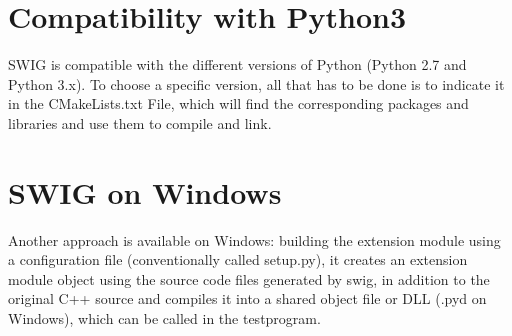 \section{Compatibility with Python3}
SWIG is compatible with the different versions of Python (Python 2.7 and Python 3.x). To choose a specific version, all that has to be done is to indicate it in the CMakeLists.txt File, which will find the corresponding packages and libraries and use them to compile and link.

\section{SWIG on Windows}
Another approach is available on Windows: building the extension module using a configuration file (conventionally called setup.py), it creates an extension module object using the source code files generated by swig, in addition to the original C++ source and compiles it into a shared object file or DLL (.pyd on Windows), which can be called in the testprogram. 


